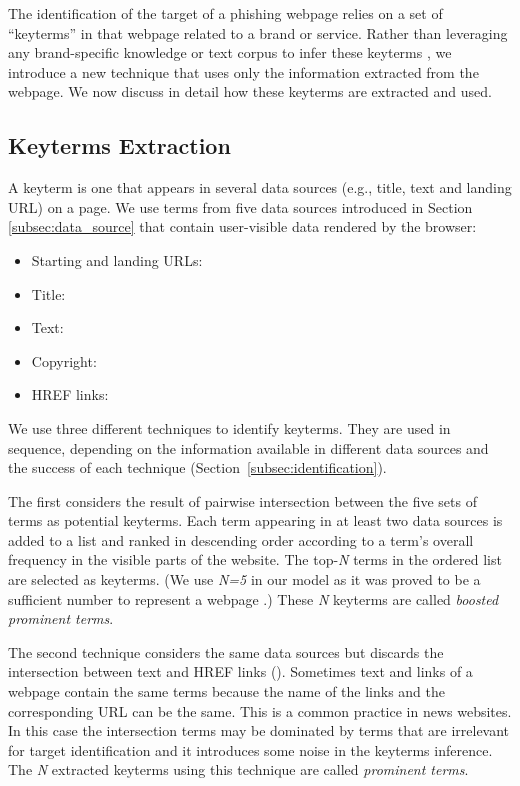 \documentclass[10pt,conference,compsocconf,letterpaper]{IEEEtran}
\begin{document}
The identification of the target of a phishing webpage relies on a set of ``keyterms'' in that webpage related to a brand or service. Rather than leveraging any brand-specific knowledge or text corpus to infer these keyterms \cite{ramesh:2014:efficious,liu:2012:anti}, we introduce a new technique that uses only the information extracted from the webpage. We now discuss in detail how these keyterms are extracted and used.

\subsection{Keyterms Extraction}

A keyterm is one that appears in several data sources (e.g., title, text and landing URL) on a page. We use terms from five data sources introduced in Section \ref{subsec:data_source} that contain user-visible data rendered by the browser:

\begin{itemize}
\item Starting and landing URLs: \\ 
\item Title: 
\item Text: 
\item Copyright: 
\item HREF links: 
\end{itemize}


We use three different techniques to identify keyterms. They are used in sequence, depending on the information available in different data sources and the success of each technique (Section~\ref{subsec:identification}).


The first considers the result of pairwise intersection between the five sets of terms as potential keyterms. Each term appearing in at least two data sources is added to a list and ranked in descending order according to a term's overall frequency in the visible parts of the website. 
The top-\textit{N} terms in the ordered list are selected as keyterms. (We use \textit{N=5} in our model as it was proved to be a sufficient number to represent a webpage \cite{zhang:2007:cantina}.) 
These \textit{N} keyterms are called \textit{boosted prominent terms}.

The second technique considers the same data sources but discards the intersection between text and HREF links ().
Sometimes text and links of a webpage contain the same terms because the name of the links and the corresponding URL can be the same. This is a common practice in news websites. In this case the intersection terms may be dominated by terms that are irrelevant for target identification and it introduces some noise in the keyterms inference.
The \textit{N} extracted keyterms using this technique are called \textit{prominent terms}.
\end{document}
